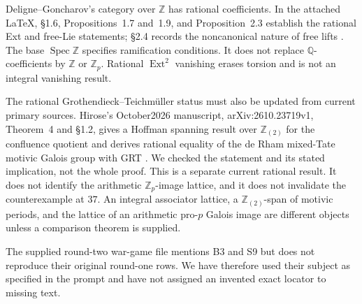 Deligne--Goncharov's category over $\mathbb Z$ has rational coefficients. In the attached LaTeX, \S1.6, Propositions~1.7 and~1.9, and Proposition~2.3 establish the rational Ext and free-Lie statements; \S2.4 records the noncanonical nature of free lifts \cite{DeligneGoncharov2005}. The base $\operatorname{Spec}\mathbb Z$ specifies ramification conditions. It does not replace $\mathbb Q$-coefficients by $\mathbb Z$ or $\mathbb Z_p$. Rational $\operatorname{Ext}^2$ vanishing erases torsion and is not an integral vanishing result.

The rational Grothendieck--Teichm\"uller status must also be updated from current primary sources. Hirose's October2026 manuscript, arXiv:2610.23719v1, Theorem~4 and \S1.2, gives a Hoffman spanning result over $\mathbb Z_{(2)}$ for the confluence quotient and derives rational equality of the de Rham mixed-Tate motivic Galois group with GRT \cite{Hirose2026}. We checked the statement and its stated implication, not the whole proof. This is a separate current rational result. It does not identify the arithmetic $\mathbb Z_p$-image lattice, and it does not invalidate the counterexample at $37$. An integral associator lattice, a $\mathbb Z_{(2)}$-span of motivic periods, and the lattice of an arithmetic pro-$p$ Galois image are different objects unless a comparison theorem is supplied.

The supplied round-two war-game file mentions B3 and S9 but does not reproduce their original round-one rows. We have therefore used their subject as specified in the prompt and have not assigned an invented exact locator to missing text.

